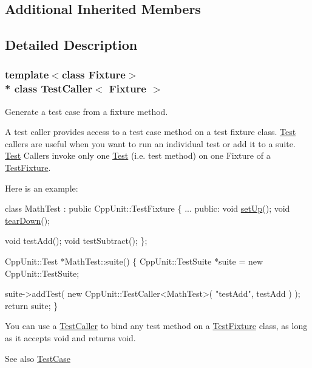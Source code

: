 \subsection*{Additional Inherited Members}


\subsection{Detailed Description}
\subsubsection*{template$<$class Fixture$>$\\*
class Test\+Caller$<$ Fixture $>$}

Generate a test case from a fixture method.

A test caller provides access to a test case method on a test fixture class. \hyperlink{class_test}{Test} callers are useful when you want to run an individual test or add it to a suite. \hyperlink{class_test}{Test} Callers invoke only one \hyperlink{class_test}{Test} (i.\+e. test method) on one Fixture of a \hyperlink{class_test_fixture}{Test\+Fixture}. 

Here is an example\+: 
\begin{DoxyCode}
\textcolor{keyword}{class }MathTest : \textcolor{keyword}{public} CppUnit::TestFixture \{
        ...
    \textcolor{keyword}{public}:
        \textcolor{keywordtype}{void}         \hyperlink{class_test_caller_ae6880afc711d24ae0b8846759064ceea}{setUp}();
        \textcolor{keywordtype}{void}         \hyperlink{class_test_caller_a0e463b88bf0ceacbd8875e0450ed2649}{tearDown}();

        \textcolor{keywordtype}{void}         testAdd();
        \textcolor{keywordtype}{void}         testSubtract();
\};

CppUnit::Test *MathTest::suite() \{
    CppUnit::TestSuite *suite = \textcolor{keyword}{new} CppUnit::TestSuite;

    suite->addTest( \textcolor{keyword}{new} CppUnit::TestCaller<MathTest>( \textcolor{stringliteral}{"testAdd"}, testAdd ) );
    \textcolor{keywordflow}{return} suite;
\}
\end{DoxyCode}


You can use a \hyperlink{class_test_caller}{Test\+Caller} to bind any test method on a \hyperlink{class_test_fixture}{Test\+Fixture} class, as long as it accepts void and returns void.

\begin{DoxySeeAlso}{See also}
\hyperlink{class_test_case}{Test\+Case} 
\end{DoxySeeAlso}


